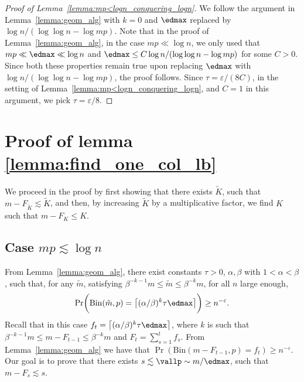 \begin{proof}[Proof of Lemma~\ref{lemma:mp<logn_conquering_logn}]
We follow the argument in Lemma~\ref{lemma:geom_alg} with \(k = 0\) and \(\edmax\) replaced by \(\log n / (\log \log n - \log mp)\). Note that in the proof of Lemma~\ref{lemma:geom_alg}, in the case \(mp \ll \log n\), we only used that \(mp \ll \edmax \ll \log n\) and \(\edmax \leq C \log n / (\log \log n - \log mp)\) for some \(C > 0\). Since both these properties remain true upon replacing \(\edmax\) with \(\log n / (\log \log n - \log mp)\), the proof follows. Since \(\tau = \varepsilon / (8C)\), in the setting of Lemma~\ref{lemma:mp<logn_conquering_logn}, and \(C = 1\) in this argument, we pick \(\tau = \varepsilon / 8\).
\end{proof}
\section{Proof of lemma \ref{lemma:find_one_col_lb}} \label{sec:appendix_proof_lemma_8}
%
We proceed in the proof by first showing that there exists \(\tilde K\), such that \(m - F_{\tilde K} \lesssim \tilde K\), and then, by increasing \(\tilde K\) by a multiplicative factor, we find \(K\) such that \(m - F_K \leq K\).
\subsection*{Case \(mp \lesssim \log n\)} 
From Lemma~\ref{lemma:geom_alg}, there exist constants \(\tau > 0\), \(\alpha, \beta\) with \(1 < \alpha < \beta\), such that, for any \(\tilde m\), satisfying \(\beta^{-k-1}m \leq \tilde m \leq \beta^{-k} m\), for all \(n\) large enough,
    \begin{equation*}
        \Pr\biggl(\mathrm{Bin}(\tilde m, p) = \bigl\lceil (\alpha / \beta)^{k} \tau \edmax\bigr\rceil \biggr) \geq n^{-\varepsilon}.
    \end{equation*}
Recall that in this case \(f_t  = \bigl\lceil (\alpha / \beta)^{k} \tau \edmax\bigr\rceil\), where \(k\) is such that \(\beta^{-k-1}m \leq m - F_{t-1} \leq \beta^{-k} m\) and \(F_t = \sum_{s = 1}^t f_s\). From Lemma~\ref{lemma:geom_alg} we have that \(\Pr(\mathrm{Bin}(m - F_{t-1}, p) = f_t) \geq n^{-\varepsilon}\). Our goal is to prove that there exists \(s \lesssim \vallp \sim m / \edmax\), such that \(m - F_s \lesssim s\). 

